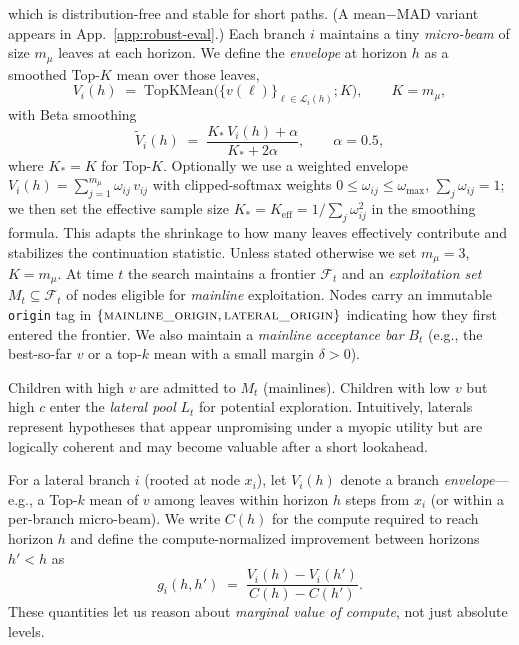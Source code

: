 \documentclass{article}
\begin{document}
which is distribution-free and stable for short paths. (A mean$-$MAD variant appears in App.~\ref{app:robust-eval}.)
Each branch $i$ maintains a tiny \emph{micro-beam} of size $m_{\mu}$ leaves at each horizon.
We define the \emph{envelope} at horizon $h$ as a smoothed Top-$K$ mean over those leaves,
\begin{equation}
V_i(h)\;=\;\text{TopKMean}\big(\{v(\ell)\}_{\ell\in\mathcal{L}_i(h)};K\big),\qquad K=m_{\mu},
\end{equation}
with Beta smoothing
\begin{equation}
\tilde V_i(h)\;=\;\frac{K_{*}\, V_i(h)+\alpha}{K_{*}+2\alpha},\qquad \alpha=0.5,
\end{equation}
where $K_{*}{=}K$ for Top-$K$.
Optionally we use a weighted envelope $V_i(h)=\sum_{j=1}^{m_\mu}\omega_{ij}\,v_{ij}$ with clipped-softmax weights $0\!\le\!\omega_{ij}\!\le\!\omega_{\max}$, $\sum_j\omega_{ij}{=}1$;
we then set the effective sample size $K_{*}{=}K_{\mathrm{eff}}=1/\sum_j \omega_{ij}^2$ in the smoothing formula.
This adapts the shrinkage to how many leaves effectively contribute and stabilizes the continuation statistic.
Unless stated otherwise we set $m_{\mu}{=}3$, $K{=}m_{\mu}$.
At time $t$ the search maintains a frontier $\mathcal{F}_t$ and an \emph{exploitation set} $M_t \subseteq \mathcal{F}_t$ of nodes eligible for \emph{mainline} exploitation.
Nodes carry an immutable \texttt{origin} tag in $\{\textsc{mainline\_origin},\textsc{lateral\_origin}\}$ indicating how they first entered the frontier.
We also maintain a \emph{mainline acceptance bar} $B_t$ (e.g., the best-so-far $v$ or a top-$k$ mean with a small margin $\delta>0$).

Children with high $v$ are admitted to $M_t$ (mainlines).
Children with low $v$ but high $c$ enter the \emph{lateral pool} $L_t$ for potential exploration.
Intuitively, laterals represent hypotheses that appear unpromising under a myopic utility but are logically coherent and may become valuable after a short lookahead.

For a lateral branch $i$ (rooted at node $x_i$), let $V_i(h)$ denote a branch \emph{envelope}—e.g., a Top-$k$ mean of $v$ among leaves within horizon $h$ steps from $x_i$ (or within a per-branch micro-beam). We write $C(h)$ for the compute required to reach horizon $h$ and define the compute-normalized improvement between horizons $h'<h$ as
\[
g_i(h,h') \;=\; \frac{V_i(h)-V_i(h')}{C(h)-C(h')}.
\]
These quantities let us reason about \emph{marginal value of compute}, not just absolute levels.
\end{document}
